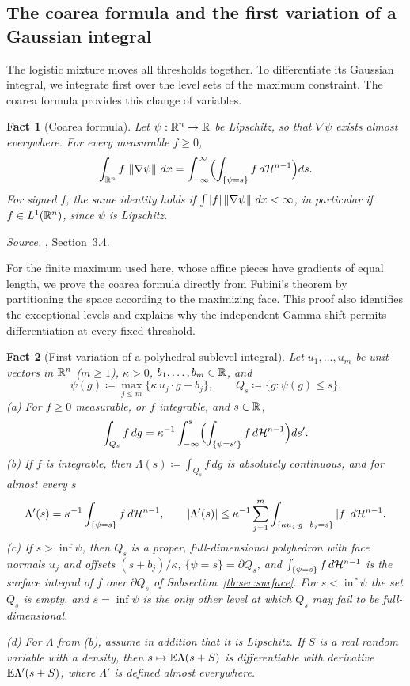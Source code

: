 \documentclass[11pt,letterpaper]{article}
\theoremstyle{plain}
\newtheorem{fact}{Fact}[section]
\begin{document}
\subsection{The coarea formula and the first variation of a Gaussian
integral}\label{tb:sec:coarea}

The logistic mixture moves all thresholds together. To differentiate
its Gaussian integral, we integrate first over the level sets of the
maximum constraint. The coarea formula provides this change of variables.

\begin{fact}[Coarea formula]\label{tb:coarea}
Let \(\psi:\mathbb R^n\to\mathbb R\) be Lipschitz, so that \(\nabla\psi\) exists almost
everywhere. For every measurable \(f\ge0\),
\[
 \int_{\mathbb R^n}f\,\left\lVert\nabla\psi\right\rVert\,dx=\int_{-\infty}^\infty
 \Bigl(\int_{\{\psi=s\}}f\,d\mathcal H^{n-1}\Bigr)ds.
\]
For signed \(f\), the same identity holds if
\(\int |f|\left\lVert\nabla\psi\right\rVert\,dx<\infty\), in particular if
\(f\in L^1(\mathbb R^n)\), since \(\psi\) is Lipschitz.
\end{fact}

\emph{Source.} , Section~3.4.

For the finite maximum used here, whose affine pieces have gradients of
equal length, we prove the coarea formula directly from Fubini's theorem
by partitioning the space according to the maximizing face.
This proof also identifies the exceptional levels and explains why the
independent Gamma shift permits differentiation at every fixed threshold.

\begin{fact}[First variation of a polyhedral sublevel integral]\label{tb:variation}
Let \(u_1,\ldots,u_m\) be unit vectors in \(\mathbb R^n\) (\(m\ge1\)), \(\kappa>0\),
\(b_1,\ldots,b_m\in\mathbb R\), and
\[
 \psi(g)\coloneqq \max_{j\le m}\{\kappa\,u_j\cdot g-b_j\},\qquad Q_s\coloneqq \{g:\psi(g)\le s\}.
\]
(a) For \(f\ge0\) measurable, or \(f\) integrable, and \(s\in\mathbb R\),
\[
 \int_{Q_s}f\,dg=\kappa^{-1}\int_{-\infty}^s\Bigl(\int_{\{\psi=s'\}}f\,d\mathcal H^{n-1}
 \Bigr)ds'.
\]
(b) If \(f\) is integrable, then \(\Lambda(s)\coloneqq \int_{Q_s}f\,dg\) is absolutely
continuous, and for almost every \(s\)
\[
 \Lambda'(s)=\kappa^{-1}\int_{\{\psi=s\}}f\,d\mathcal H^{n-1},\qquad
 |\Lambda'(s)|\le\kappa^{-1}\sum_{j=1}^m\int_{\{\kappa u_j\cdot g-b_j=s\}}|f|\,d\mathcal H^{n-1}.
\]
(c) If \(s>\inf\psi\), then \(Q_s\) is a proper, full-dimensional polyhedron
with face normals \(u_j\) and offsets \((s+b_j)/\kappa\), \(\{\psi=s\}=\partial Q_s\),
and \(\int_{\{\psi=s\}}f\,d\mathcal H^{n-1}\) is the surface integral of \(f\) over
\(\partial Q_s\) of Subsection~\ref{tb:sec:surface}. For \(s<\inf\psi\) the set
\(Q_s\) is empty, and \(s=\inf\psi\) is the only other level at which \(Q_s\)
may fail to be full-dimensional.

(d) For \(\Lambda\) from (b), assume in addition that it is
Lipschitz. If \(S\) is a real random variable with a density, then \(s\mapsto\mathbb E\Lambda(s+S)\) is differentiable with derivative
\(\mathbb E\Lambda'(s+S)\), where \(\Lambda'\) is defined almost everywhere.
\end{fact}
\end{document}
